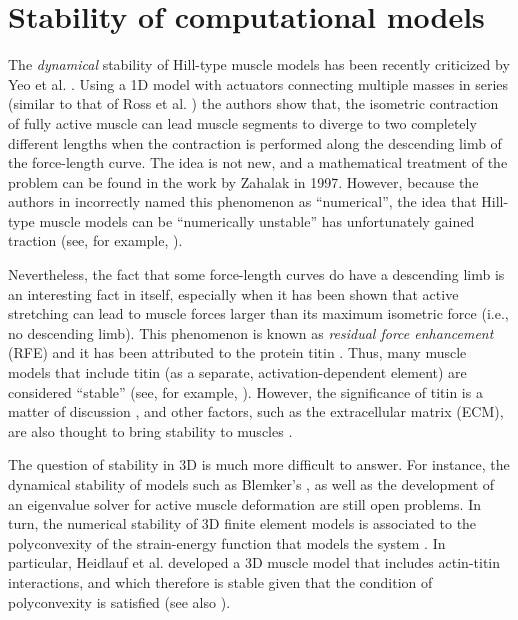 \documentclass{sfuthesis}
\numberwithin{equation}{section}
\numberwithin{figure}{chapter}
\numberwithin{table}{chapter}
\theoremstyle{definition}
\begin{document}
\section{Stability of computational models}

The \textit{dynamical} stability of Hill-type muscle models has been recently criticized by Yeo et al. \cite{YeoEtAl2023NumericalInstability}. Using a 1D model with actuators connecting multiple masses in series (similar to that of Ross et al. \cite{Ross2018-1D}) the authors show that, the isometric contraction of fully active muscle can lead muscle segments to diverge to two completely different lengths when the contraction is performed along the descending limb of the force-length curve. 
The idea is not new, and a mathematical treatment of the problem can be found in the work by Zahalak \cite{Zahalak1997} in 1997. However, because the authors in \cite{YeoEtAl2023NumericalInstability} incorrectly named this phenomenon as ``numerical'', the idea that Hill-type muscle models can be ``numerically unstable'' has unfortunately gained traction (see, for example, \cite{Mendoza2025,SampaioDeOliveiraUchida2025}). 

Nevertheless, the fact that some force-length curves do have a descending limb is an interesting fact in itself, especially when it has been shown that active stretching can lead to muscle forces larger than its maximum isometric force (i.e., no descending limb). This phenomenon is known as \textit{residual force enhancement} (RFE) \cite{HerzogLeonard2002} and it has been attributed to the protein titin \cite{Herzog2014Titin}. Thus, many muscle models that include titin (as a separate, activation-dependent element) are considered ``stable'' (see, for example, \cite{HeidlaufEtAl2017,Millard2024,SampaioDeOliveiraUchida2025}). However, the significance of titin is a matter of discussion \cite{Lieber2018NotTitin}, and other factors, such as the extracellular matrix (ECM), are also thought to bring stability to muscles \cite{GilliesLieber2011ECM}.

The question of stability in 3D is much more difficult to answer. For instance, the dynamical stability of models such as Blemker's \cite{BlemkerPinskyDelp2005}, as well as the development of an eigenvalue solver for active muscle deformation are still open problems. In turn, the numerical stability of 3D finite element models is associated to the polyconvexity of the strain-energy function that models the system \cite{SchroderNeff2003}. In particular, Heidlauf et al. \cite{HeidlaufEtAl2017} developed a 3D muscle model that includes actin-titin interactions, and which therefore is stable given that the condition of polyconvexity is satisfied (see also \cite{SampaioDeOliveiraUchida2025}).
\end{document}
